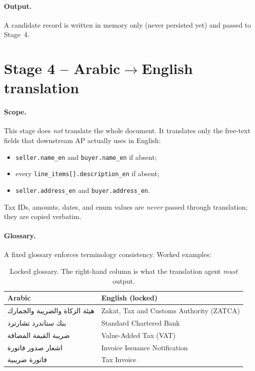 \documentclass[11pt,a4paper,twoside]{report}
\newcommand{\ar}[1]{\foreignlanguage{arabic}{#1}}
\begin{document}
\paragraph{Output.} A candidate record is written in memory only (never
persisted yet) and passed to Stage~4.

\section{Stage 4 -- Arabic$\to$English translation}

\paragraph{Scope.} This stage does \emph{not} translate the whole
document. It translates only the free-text fields that downstream AP
actually uses in English:

\begin{itemize}
\item \texttt{seller.name\_en} and \texttt{buyer.name\_en} if absent;
\item every \texttt{line\_items[].description\_en} if absent;
\item \texttt{seller.address\_en} and \texttt{buyer.address\_en}.
\end{itemize}

Tax IDs, amounts, dates, and enum values are \emph{never} passed through
translation; they are copied verbatim.

\paragraph{Glossary.} A fixed glossary enforces terminology consistency.
Worked examples:

\begin{table}[htbp]
\centering
\caption{Locked glossary. The right-hand column is what the translation
agent \emph{must} output.}
\label{tab:glossary}
\small
\begin{tabularx}{\linewidth}{@{}X X@{}}
\toprule
\textbf{Arabic} & \textbf{English (locked)} \\ \midrule
\ar{هيئة الزكاة والضريبة والجمارك} & Zakat, Tax and Customs Authority (ZATCA) \\
\ar{بنك ستاندرد تشارترد}           & Standard Chartered Bank \\
\ar{ضريبة القيمة المضافة}           & Value-Added Tax (VAT) \\
\ar{اشعار صدور فاتورة}              & Invoice Issuance Notification \\
\ar{فاتورة ضريبية}                  & Tax Invoice \\
\bottomrule
\end{tabularx}
\end{table}
\end{document}
